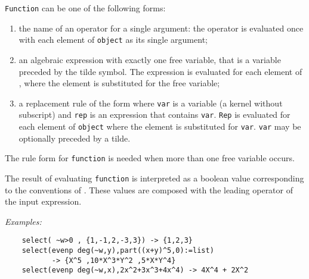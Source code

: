 {\tt Function} can be one of the following forms:
\begin{enumerate}
\item the name of an operator for a single argument: the operator
is evaluated once with each element of {\tt object} as its single argument;
\item an algebraic expression with exactly one free variable, that is
a variable preceded by the tilde symbol. The expression
is evaluated for each element of , where the element is
substituted for the free variable;
\item a replacement rule of the form 
where {\tt var} is a variable (a kernel without subscript)
and {\tt rep} is an expression that contains {\tt var}.
{\tt Rep} is evaluated for each element of {\tt object} where
the element is substituted for  {\tt var}. {\tt var} may be
optionally preceded by a tilde.
\end{enumerate}
The rule form  for {\tt function} is needed when more than
one free variable occurs.

The result of evaluating {\tt function} is
interpreted as a boolean value corresponding to the conventions of
{\REDUCE}. These values are composed with the leading operator of the
input expression.

{\it Examples:}
\begin{verbatim}
	select( ~w>0 , {1,-1,2,-3,3}) -> {1,2,3}
	select(evenp deg(~w,y),part((x+y)^5,0):=list)
	       -> {X^5 ,10*X^3*Y^2 ,5*X*Y^4}
	select(evenp deg(~w,x),2x^2+3x^3+4x^4) -> 4X^4 + 2X^2
\end{verbatim}


